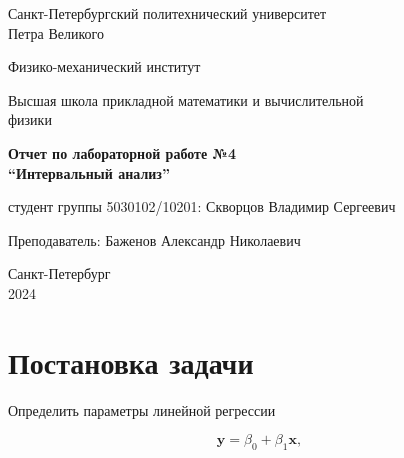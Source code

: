 \documentclass{article}
\begin{document}
  \begin{titlepage}
    \begin{center}
      Санкт-Петербургский политехнический университет \\Петра Великого
    \end{center}

    \begin{center}
      Физико-механический институт
    \end{center}

    \begin{center}
      Высшая школа прикладной математики и вычислительной\\ физики
    \end{center}

    \vspace{8em}

    \begin{center}
      \textbf{Отчет по лабораторной работе №4}\\
      \textbf{“Интервальный анализ”}
    \end{center}

    \vspace{\fill}

    \begin{flushright}
       студент группы 5030102/10201:
      \hfill
      Скворцов Владимир Сергеевич \\
    \end{flushright}
    Преподаватель: \hfill Баженов Александр Николаевич

    \vspace{12em}

    \begin{center}
      Санкт-Петербург\\
      2024
    \end{center}
  \end{titlepage}

  \tableofcontents

  \newpage

  \section{Постановка задачи}

  Определить параметры линейной регрессии

  \begin{equation} \label{eq:islau}
    \mathbf{y} = \beta_0 + \beta_1 \mathbf{x},
  \end{equation}
\end{document}
